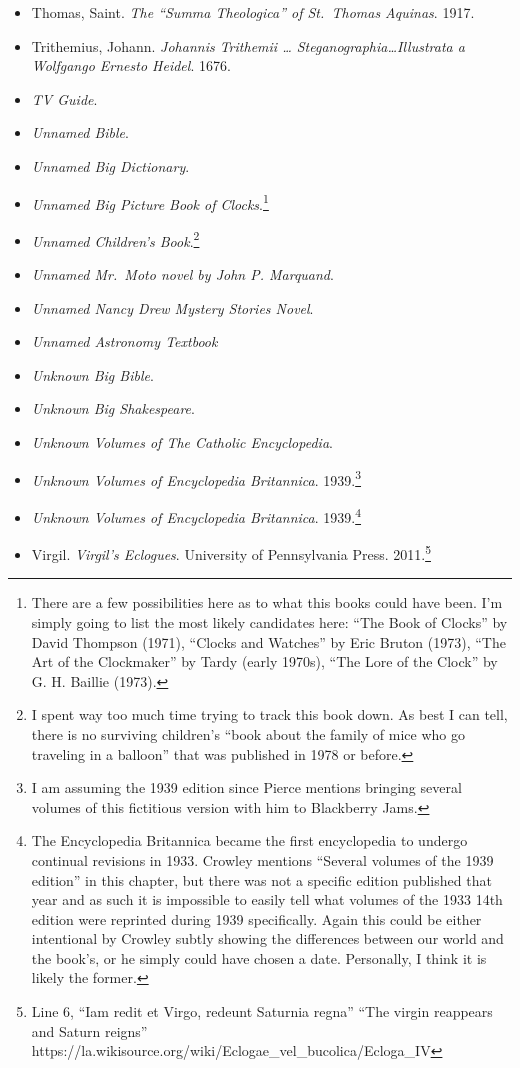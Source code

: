 \documentclass[12pt]{article}
\begin{document}
\begin{itemize}
\item
  Thomas, Saint. \emph{The ``Summa Theologica'' of St.~Thomas Aquinas}. 1917.
\item
  Trithemius, Johann. \emph{Johannis Trithemii \ldots{} Steganographia\ldots Illustrata a Wolfgango Ernesto Heidel}. 1676.
\item
  \emph{TV Guide}.
\item
  \emph{Unnamed Bible}.
\item
  \emph{Unnamed Big Dictionary}.
\item
  \emph{Unnamed Big Picture Book of Clocks}.\footnote{There are a few possibilities here as to what this books could have been. I'm simply going to list the most likely candidates here: ``The Book of Clocks'' by David Thompson (1971), ``Clocks and Watches'' by Eric Bruton (1973), ``The Art of the Clockmaker'' by Tardy (early 1970s), ``The Lore of the Clock'' by G. H. Baillie (1973).}
\item
  \emph{Unnamed Children's Book}.\footnote{I spent way too much time trying to track this book down. As best I can tell, there is no surviving children's ``book about the family of mice who go traveling in a balloon'' that was published in 1978 or before.}
\item
  \emph{Unnamed Mr.~Moto novel by John P. Marquand}.
\item
  \emph{Unnamed Nancy Drew Mystery Stories Novel}.
\item
  \emph{Unnamed Astronomy Textbook}
\item
  \emph{Unknown Big Bible}.
\item
  \emph{Unknown Big Shakespeare}.
\item
  \emph{Unknown Volumes of The Catholic Encyclopedia}.
\item
  \emph{Unknown Volumes of Encyclopedia Britannica}. 1939.\footnote{I am assuming the 1939 edition since Pierce mentions bringing several volumes of this fictitious version with him to Blackberry Jams.}
\item
  \emph{Unknown Volumes of Encyclopedia Britannica}. 1939.\footnote{The Encyclopedia Britannica became the first encyclopedia to undergo continual revisions in 1933. Crowley mentions ``Several volumes of the 1939 edition'' in this chapter, but there was not a specific edition published that year and as such it is impossible to easily tell what volumes of the 1933 14th edition were reprinted during 1939 specifically. Again this could be either intentional by Crowley subtly showing the differences between our world and the book's, or he simply could have chosen a date. Personally, I think it is likely the former.}
\item
  Virgil. \emph{Virgil's Eclogues}. University of Pennsylvania Press. 2011.\footnote{Line 6, ``Iam redit et Virgo, redeunt Saturnia regna'' ``The virgin reappears and Saturn reigns'' https://la.wikisource.org/wiki/Eclogae\_vel\_bucolica/Ecloga\_IV}
\end{itemize}
\end{document}
